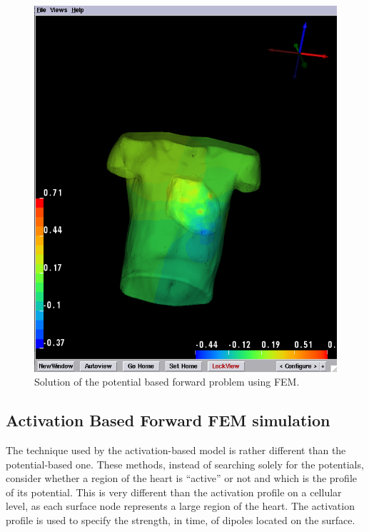 \begin{figure}[H]
\begin{center}
\includegraphics[width=\textwidth]{ECGToolkitGuide_figures/pot_fem_forward_output.png}
\caption{Solution of the potential based forward problem using FEM.}
\label{fig:pot_fem_for_sol}
\end{center}
\end{figure}



\subsection{Activation Based Forward FEM simulation}

The technique used by the activation-based model is rather different than
the potential-based one. These methods, instead of searching solely for the
potentials, consider whether a region of the heart is ``active'' or not and
which is the profile of its potential. This is very different than the activation
profile on a cellular level, as each surface node represents a large region of the
heart. The activation profile is used to specify the strength, in time, of
dipoles located on the surface.

